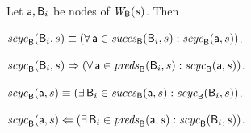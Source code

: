 \begin{proposition}
\label{prop:sc-membership}
Let $\act, \B_i$ be nodes of $\wfg{\B}{s}$. Then
\bn

\item \label{clause:sc-membership:comp-out}
$\scyc{\B}{s}{\B_i} \ifof (\fa \act \in \succs{\B}{s}{\B_i} : \scyc{\B}{s}{\act})$.

\item \label{clause:sc-membership:comp-in}
$\scyc{\B}{s}{\B_i} \imp (\fa \act \in \preds{\B}{s}{\B_i} : \scyc{\B}{s}{\act})$.

\item \label{clause:sc-membership:act-out}
$\scyc{\B}{s}{\act} \ifof (\ex \B_i \in \succs{\B}{s}{\act} : \scyc{\B}{s}{\B_i})$.

\item \label{clause:sc-membership:act-in}
$\scyc{\B}{s}{\act} \folf (\ex \B_i \in \preds{\B}{s}{\act} : \scyc{\B}{s}{\B_i})$.

\en
\end{proposition}
%

